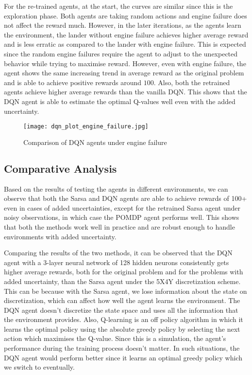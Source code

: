 \documentclass[10pt, conference]{IEEEtran}
\begin{document}
For the re-trained agents, at the start, the curves are similar since this is the exploration phase. Both agents are taking random actions and engine failure does not affect the reward much. However, in the later iterations, as the agents learn the environment, the lander without engine failure achieves higher average reward and is less erratic as compared to the lander with engine failure. This is expected since the random engine failures require the agent to  adjust to the unexpected behavior while trying to maximise reward. However, even with engine failure, the agent shows the same increasing trend in average reward as the original problem and is able to achieve positive rewards around $100$. Also, both the retrained agents achieve higher average rewards than the vanilla DQN. This shows that the DQN agent is able to estimate the optimal Q-values well even with the added uncertainty. 

\begin{figure}[!t]
    \centering
    \texttt{[image: dqn\_plot\_engine\_failure.jpg]}
    \caption{Comparison of DQN agents under engine failure}
    \label{fig:dqn_agent_engine_failure}
\end{figure}

\subsection{Comparative Analysis}
Based on the results of testing the agents in different environments, we can observe that both the Sarsa and DQN agents are able to achieve rewards of 100+ even in cases of added uncertainties, except for the retrained Sarsa agent under noisy observations, in which case the POMDP agent performs well. This shows that both the methods work well in practice and are robust enough to handle environments with added uncertainty. 

Comparing the results of the two methods, it can be observed that the DQN agent with a 3-layer neural network of 128 hidden neurons consistently gets higher average rewards, both for the original problem and for the problems with added uncertainty, than the Sarsa agent under the 5X4Y discretization scheme. This can be because with the Sarsa agent, we lose information about the state on discretization, which can affect how well the agent learns the environment. The 
DQN agent doesn't discretize the state space and uses all the information that the environment provides. Also, Q-learning is an off policy algorithm in which it learns the optimal policy using the absolute greedy policy by selecting the next action which maximises the Q-value. Since this is a simulation, the agent's performance during the training process doesn't matter. In such situations, the DQN agent would perform better since it learns an optimal greedy policy which we switch to eventually.
\end{document}
